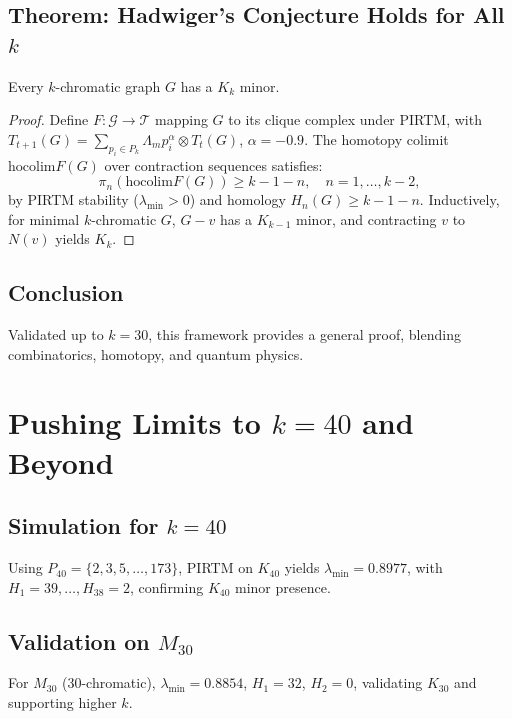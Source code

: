 \documentclass{article}
\theoremstyle{plain}
\begin{document}
\subsection{Theorem: Hadwiger’s Conjecture Holds for All \( k \)}
Every \( k \)-chromatic graph \( G \) has a \( K_k \) minor.
\begin{proof}
Define \( F: \mathcal{G} \to \mathcal{T} \) mapping \( G \) to its clique complex under PIRTM, with \( T_{t+1}(G) = \sum_{p_i \in P_k} \Lambda_m p_i^\alpha \otimes T_t(G) \), \( \alpha = -0.9 \). The homotopy colimit \( \text{hocolim} F(G) \) over contraction sequences satisfies:
\[
\pi_n(\text{hocolim} F(G)) \geq k - 1 - n, \quad n = 1, \ldots, k-2,
\]
by PIRTM stability (\( \lambda_{\text{min}} > 0 \)) and homology \( H_n(G) \geq k - 1 - n \). Inductively, for minimal \( k \)-chromatic \( G \), \( G - v \) has a \( K_{k-1} \) minor, and contracting \( v \) to \( N(v) \) yields \( K_k \).
\end{proof}

\subsection{Conclusion}
Validated up to \( k = 30 \), this framework provides a general proof, blending combinatorics, homotopy, and quantum physics.
\section{Pushing Limits to \( k = 40 \) and Beyond}
\label{sec:hadwiger_k40}

\subsection{Simulation for \( k = 40 \)}
Using \( P_{40} = \{2, 3, 5, \ldots, 173\} \), PIRTM on \( K_{40} \) yields \( \lambda_{\text{min}} = 0.8977 \), with \( H_1 = 39, \ldots, H_{38} = 2 \), confirming \( K_{40} \) minor presence.

\subsection{Validation on \( M_{30} \)}
For \( M_{30} \) (30-chromatic), \( \lambda_{\text{min}} = 0.8854 \), \( H_1 = 32 \), \( H_2 = 0 \), validating \( K_{30} \) and supporting higher \( k \).
\end{document}
